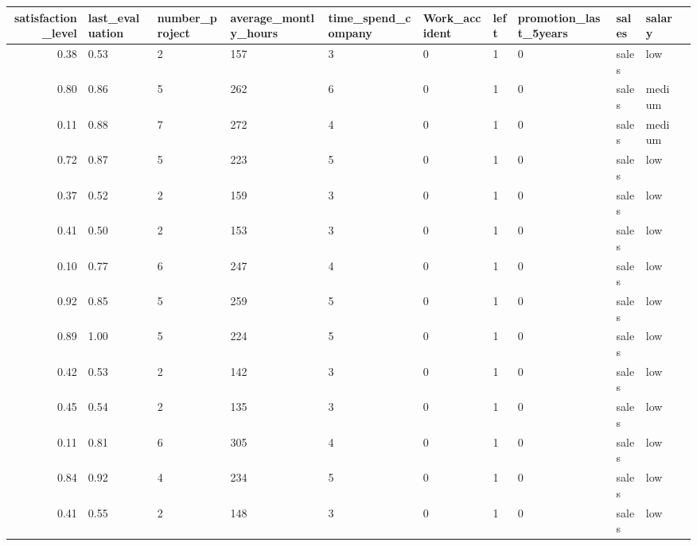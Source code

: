 \documentclass[11pt]{article}
\begin{document}
    \begin{tabular}{r|llllllllll}
 satisfaction\_level & last\_evaluation & number\_project & average\_montly\_hours & time\_spend\_company & Work\_accident & left & promotion\_last\_5years & sales & salary\\
\hline
	 0.38       & 0.53       & 2          & 157        & 3          & 0          & 1          & 0          & sales      & low       \\
	 0.80       & 0.86       & 5          & 262        & 6          & 0          & 1          & 0          & sales      & medium    \\
	 0.11       & 0.88       & 7          & 272        & 4          & 0          & 1          & 0          & sales      & medium    \\
	 0.72       & 0.87       & 5          & 223        & 5          & 0          & 1          & 0          & sales      & low       \\
	 0.37       & 0.52       & 2          & 159        & 3          & 0          & 1          & 0          & sales      & low       \\
	 0.41       & 0.50       & 2          & 153        & 3          & 0          & 1          & 0          & sales      & low       \\
	 0.10       & 0.77       & 6          & 247        & 4          & 0          & 1          & 0          & sales      & low       \\
	 0.92       & 0.85       & 5          & 259        & 5          & 0          & 1          & 0          & sales      & low       \\
	 0.89       & 1.00       & 5          & 224        & 5          & 0          & 1          & 0          & sales      & low       \\
	 0.42       & 0.53       & 2          & 142        & 3          & 0          & 1          & 0          & sales      & low       \\
	 0.45       & 0.54       & 2          & 135        & 3          & 0          & 1          & 0          & sales      & low       \\
	 0.11       & 0.81       & 6          & 305        & 4          & 0          & 1          & 0          & sales      & low       \\
	 0.84       & 0.92       & 4          & 234        & 5          & 0          & 1          & 0          & sales      & low       \\
	 0.41       & 0.55       & 2          & 148        & 3          & 0          & 1          & 0          & sales      & low       \\

\end{tabular}
\end{document}
